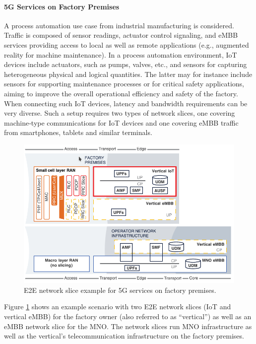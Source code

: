 \documentclass{article}
\begin{document}
\paragraph{5G Services on Factory Premises}

A process automation use case from industrial manufacturing is considered. Traffic is composed of sensor readings, actuator control signaling, and eMBB services providing access to local as well as remote applications (e.g., augmented reality for machine maintenance).
In a process automation environment, IoT devices include actuators, such as pumps, valves, etc., and
sensors for capturing heterogeneous physical and logical quantities. The latter may for instance include sensors for supporting maintenance processes or for critical safety
applications, aiming to improve the overall operational efficiency and safety of the factory. When
connecting such IoT devices, latency and bandwidth requirements can be very diverse. Such a setup
requires two types of network slices, one covering machine‐type communications for IoT devices
and one covering eMBB traffic from smartphones, tablets and similar terminals. 
\begin{figure}
\centering
\includegraphics[scale=0.5]{pics/example.png}
\caption{E2E network slice example for 5G services on factory premises.}
\label{exem} 
\end{figure}
Figure \ref{exem} shows an example scenario with two E2E network slices (IoT and vertical eMBB) for the factory owner (also
referred to as “vertical”) as well as an eMBB network slice for the MNO. The network slices run MNO infrastructure as well as the vertical’s telecommunication infrastructure on the factory premises.
\end{document}
